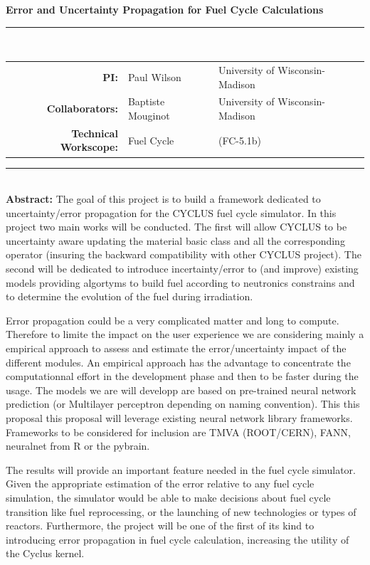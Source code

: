 \documentclass[dvips,12pt]{article}
\begin{document}
\vspace*{0.5in}
\begin{centering}
  \textbf{\large Error and Uncertainty Propagation for Fuel Cycle Calculations}\\
\end{centering}

\noindent\rule{\textwidth}{0.4pt}\\

\noindent
\begin{tabular}{rll}
\textbf{PI:} & Paul Wilson & University of Wisconsin-Madison\\
\textbf{Collaborators:} & Baptiste Mouginot & University of Wisconsin-Madison\\
\textbf{Technical Workscope:} & Fuel Cycle  & (FC-5.1b)\\
\end{tabular}

\vspace{0.2in}
\noindent\rule{\textwidth}{0.4pt}\\

\noindent\textbf{Abstract:} 
The goal of this project is to build a framework
dedicated to uncertainty/error propagation for the
CYCLUS fuel cycle simulator. In this project two
main works will be conducted. The first will allow
CYCLUS to be uncertainty aware updating the
material basic class and all the corresponding
operator (insuring the backward compatibility with
other CYCLUS project). The second will be
dedicated to introduce incertainty/error to (and
improve) existing models providing algortyms to
build fuel according to neutronics constrains and
to determine the evolution of the fuel during
irradiation.

Error propagation could be a very complicated
matter and long to compute. Therefore to limite
the impact on the user experience we are
considering mainly a empirical approach to assess
and estimate the error/uncertainty impact of the
different modules. An empirical approach has the
advantage to concentrate the computationnal effort
in the development phase and then to be faster
during the usage. The models we are will developp
are based on pre-trained neural network prediction
(or Multilayer perceptron depending on naming
convention). This this proposal this proposal will
leverage existing neural network library
frameworks. Frameworks to be considered for
inclusion are TMVA (ROOT/CERN), FANN, neuralnet
from R or the pybrain.

The results will provide an important feature
needed in the fuel cycle simulator. Given the
appropriate estimation of the error relative to
any fuel cycle simulation, the simulator would be
able to make decisions about fuel cycle transition
like fuel reprocessing, or the launching of new
technologies or types of reactors. Furthermore,
the project will be one of the first of its kind
to introducing error propagation in fuel cycle
calculation, increasing the utility of the Cyclus
kernel.
\end{document}
